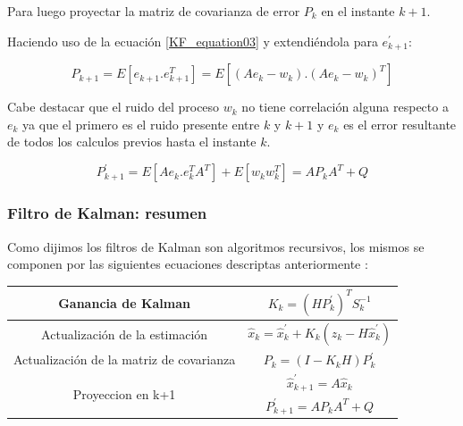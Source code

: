 \documentclass[10pt,a4paper]{article}
\begin{document}
Para luego proyectar la matriz de covarianza de error $P_k$ en el instante $k+1$.

Haciendo uso de la ecuación \ref{KF_equation03} y extendiéndola para $e^\prime_{k+1}$:

\begin{figure}[h!]
	\begin{center}
		\begin{equation}
		P_{k+1} = E[e_{k+1}.e_{k+1}^{T}] = E[(A e_k-w_k).(A  e_k-w_k)^{T}]
		\label{projection_p_k_aux}
		\end{equation}	
	\end{center}
\end{figure}

Cabe destacar que el ruido del proceso $w_k$ no tiene correlación alguna respecto a $e_k$ ya que el primero es el ruido presente entre $k$ y $k+1$ y $e_k$ es el error resultante de todos los calculos previos hasta el instante $k$.

\begin{figure}[h!]
	\begin{center}
		\begin{equation}
		P^\prime_{k+1} = E[A e_{k}.e_{k}^{T}A^{T}]+ E[w_k w_k^{T}]= A P_k A^{T} + Q
		\label{projection_p_k}
		\end{equation}	
	\end{center}
\end{figure}

\clearpage

\subsubsection{Filtro de Kalman: resumen}

Como dijimos los filtros de Kalman son algoritmos recursivos, los mismos se componen por las siguientes ecuaciones descriptas anteriormente :\\


\begin{table}[h!]
	\centering
	\begin{tabular}{|c|c|}
		\hline
		\rule{0pt}{4ex}	Ganancia de Kalman 							& $K_k = (H P^\prime_k)^T S_k^{-1}$  \\ \hline
		\rule{0pt}{4ex}	Actualización de la estimación			    &  $\hat{x}_k = \hat{x}^\prime_k + K_k (z_k - H\hat{x}^\prime_k)$\\ \hline
		\rule{0pt}{4ex}	Actualización de la matriz de covarianza    & $P_k = (I - K_k H) P^\prime_k$ \\ \hline
		\multirow{2}{*}{Proyeccion en k+1}        		  			& \rule{0pt}{4ex} $\hat{x}^\prime_{k+1} = A \hat{x}_k$ \\ \cline{2-2}
																	& \rule{0pt}{4ex} $P^\prime_{k+1} = A P_k A^{T} + Q$ \\ \hline
	\end{tabular}
	\label{Ecuaciones_Kalman}
\end{table}
\end{document}
